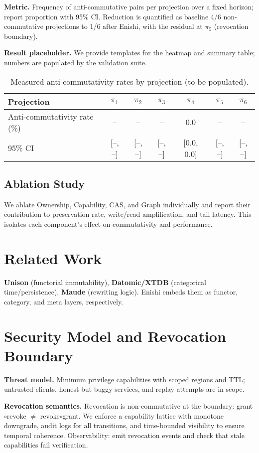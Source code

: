 \documentclass[10pt]{article}
\begin{document}
\textbf{Metric.} Frequency of anti-commutative pairs per projection over a fixed horizon; report proportion with 95\% CI. Reduction is quantified as baseline 4/6 non-commutative projections to 1/6 after Enishi, with the residual at $\pi_5$ (revocation boundary).

\textbf{Result placeholder.} We provide templates for the heatmap and summary table; numbers are populated by the validation suite.

\begin{table}[h]
\centering
\small
\begin{tabular}{lcccccc}
\toprule
Projection & $\pi_1$ & $\pi_2$ & $\pi_3$ & $\pi_4$ & $\pi_5$ & $\pi_6$ \\
\midrule
Anti-commutativity rate (\%) & -- & -- & -- & 0.0 & -- & -- \\
95\% CI & [--, --] & [--, --] & [--, --] & [0.0, 0.0] & [--, --] & [--, --] \\
\bottomrule
\end{tabular}
\caption{Measured anti-commutativity rates by projection (to be populated).}
\label{tab:anti-measure}
\end{table}

\subsection{Ablation Study}
We ablate Ownership, Capability, CAS, and Graph individually and report their contribution to preservation rate, write/read amplification, and tail latency. This isolates each component's effect on commutativity and performance.

\section{Related Work}
\textbf{Unison} (functorial immutability), \textbf{Datomic/XTDB} (categorical time/persistence),
\textbf{Maude} (rewriting logic). Enishi embeds them as functor, category, and meta layers, respectively.

\section{Security Model and Revocation Boundary}\label{sec:security}
\textbf{Threat model.} Minimum privilege capabilities with scoped regions and TTL; untrusted clients, honest-but-buggy services, and replay attempts are in scope.

\textbf{Revocation semantics.} Revocation is non-commutative at the boundary: grant$\circ$revoke $\ne$ revoke$\circ$grant. We enforce a capability lattice with monotone downgrade, audit logs for all transitions, and time-bounded visibility to ensure temporal coherence. Observability: emit revocation events and check that stale capabilities fail verification.
\end{document}
